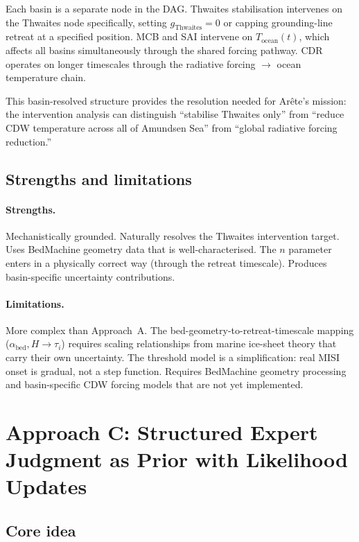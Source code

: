 \documentclass[11pt]{article}
\begin{document}
Each basin is a separate node in the DAG.  Thwaites stabilisation intervenes on the Thwaites node specifically, setting $g_{\text{Thwaites}} = 0$ or capping grounding-line retreat at a specified position.  MCB and SAI intervene on $T_{\text{ocean}}(t)$, which affects all basins simultaneously through the shared forcing pathway.  CDR operates on longer timescales through the radiative forcing $\to$ ocean temperature chain.

This basin-resolved structure provides the resolution needed for Ar\^{e}te's mission: the intervention analysis can distinguish ``stabilise Thwaites only'' from ``reduce CDW temperature across all of Amundsen Sea'' from ``global radiative forcing reduction.''

\subsection{Strengths and limitations}

\paragraph{Strengths.}  Mechanistically grounded.  Naturally resolves the Thwaites intervention target.  Uses BedMachine geometry data that is well-characterised.  The $n$ parameter enters in a physically correct way (through the retreat timescale).  Produces basin-specific uncertainty contributions.

\paragraph{Limitations.}  More complex than Approach~A.  The bed-geometry-to-retreat-timescale mapping ($\alpha_{\text{bed}}, H \to \tau_i$) requires scaling relationships from marine ice-sheet theory that carry their own uncertainty.  The threshold model is a simplification: real MISI onset is gradual, not a step function.  Requires BedMachine geometry processing and basin-specific CDW forcing models that are not yet implemented.


\section{Approach C: Structured Expert Judgment as Prior with Likelihood Updates}
\label{sec:approach_c}

\subsection{Core idea}
\end{document}
